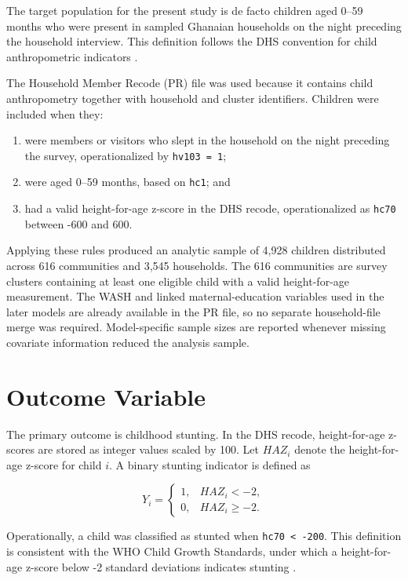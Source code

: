 The target population for the present study is de facto children aged 0--59 months who were present in sampled Ghanaian households on the night preceding the household interview. This definition follows the DHS convention for child anthropometric indicators \citep{DHSGuide2023}.

The Household Member Recode (PR) file was used because it contains child anthropometry together with household and cluster identifiers. Children were included when they:

\begin{enumerate}
    \item were members or visitors who slept in the household on the night preceding the survey, operationalized by \texttt{hv103 = 1};
    \item were aged 0--59 months, based on \texttt{hc1}; and
    \item had a valid height-for-age z-score in the DHS recode, operationalized as \texttt{hc70} between -600 and 600.
\end{enumerate}

Applying these rules produced an analytic sample of 4,928 children distributed across 616 communities and 3,545 households. The 616 communities are survey clusters containing at least one eligible child with a valid height-for-age measurement. The WASH and linked maternal-education variables used in the later models are already available in the PR file, so no separate household-file merge was required. Model-specific sample sizes are reported whenever missing covariate information reduced the analysis sample.

\section{Outcome Variable}

The primary outcome is childhood stunting. In the DHS recode, height-for-age z-scores are stored as integer values scaled by 100. Let $HAZ_i$ denote the height-for-age z-score for child $i$. A binary stunting indicator is defined as

\begin{equation}
Y_i =
\begin{cases}
1, & HAZ_i < -2, \\
0, & HAZ_i \ge -2.
\end{cases}
\end{equation}

Operationally, a child was classified as stunted when \texttt{hc70 < -200}. This definition is consistent with the WHO Child Growth Standards, under which a height-for-age z-score below -2 standard deviations indicates stunting \cite{WHOStunting2026}.

